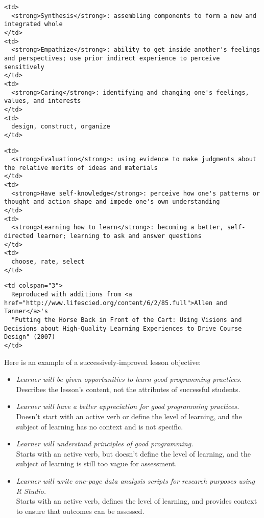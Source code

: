 \begin{verbatim}
<td>
  <strong>Synthesis</strong>: assembling components to form a new and integrated whole
</td>
<td>
  <strong>Empathize</strong>: ability to get inside another's feelings and perspectives; use prior indirect experience to perceive sensitively
</td>
<td>
  <strong>Caring</strong>: identifying and changing one's feelings, values, and interests
</td>
<td>
  design, construct, organize
</td>
\end{verbatim}

\begin{verbatim}
<td>
  <strong>Evaluation</strong>: using evidence to make judgments about the relative merits of ideas and materials
</td>
<td>
  <strong>Have self-knowledge</strong>: perceive how one's patterns or thought and action shape and impede one's own understanding
</td>
<td>
  <strong>Learning how to learn</strong>: becoming a better, self-directed learner; learning to ask and answer questions
</td>
<td>
  choose, rate, select
</td>
\end{verbatim}

\begin{verbatim}
<td colspan="3">
  Reproduced with additions from <a href="http://www.lifescied.org/content/6/2/85.full">Allen and Tanner</a>'s
  "Putting the Horse Back in Front of the Cart: Using Visions and Decisions about High-Quality Learning Experiences to Drive Course Design" (2007)
</td>
\end{verbatim}

Here is an example of a successively-improved lesson objective:

\begin{itemize}
\item
  \textit{Learner will be given opportunities to learn good programming practices.}
  \\
  Describes the lesson's content, not the attributes of successful students.
\item
  \textit{Learner will have a better appreciation for good programming practices.}
  \\
  Doesn't start with an active verb or define the level of learning,
  and the subject of learning has no context and is not specific.
\item
  \textit{Learner will understand principles of good programming.}
  \\
  Starts with an active verb, but doesn't define the level of learning,
  and the subject of learning is still too vague for assessment.
\item
  \textit{Learner will write one-page data analysis scripts for research purposes using R Studio.}
  \\
  Starts with an active verb, defines the level of learning,
  and provides context to ensure that outcomes can be assessed.
\end{itemize}

